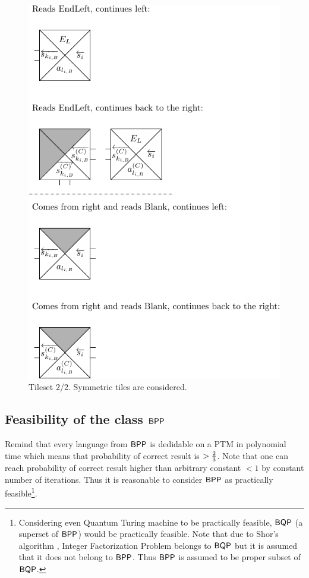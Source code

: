 		\begin{figure}[h]
		\begin{center}
			\includegraphics{./figures/tiles2.pdf}
			\caption{Tileset 2/2. Symmetric tiles are considered.}
			\label{fig:tileset2}
		\end{center}
		\end{figure}

\subsection{Feasibility of the class $\mathsf{BPP}$}
	
	Remind that every language from $\mathsf{BPP}$ is dedidable on a PTM in polynomial time which means that probability of correct result is $> \nicefrac{2}{3}$. Note that one can reach probability of correct result higher than arbitrary constant $<1$ by constant number of iterations. Thus it is reasonable to consider $\mathsf{BPP}$ as practically feasible\footnote{Considering even Quantum Turing machine to be practically feasible, $\mathsf{BQP}$ (a superset of $\mathsf{BPP}$) would be practically feasible. Note that due to Shor's algorithm \cite{shor94}, Integer Factorization Problem belongs to $\mathsf{BQP}$ but it is assumed that it does not belong to $\mathsf{BPP}$. Thus $\mathsf{BPP}$ is assumed to be proper subset of $\mathsf{BQP}$.}.
	
